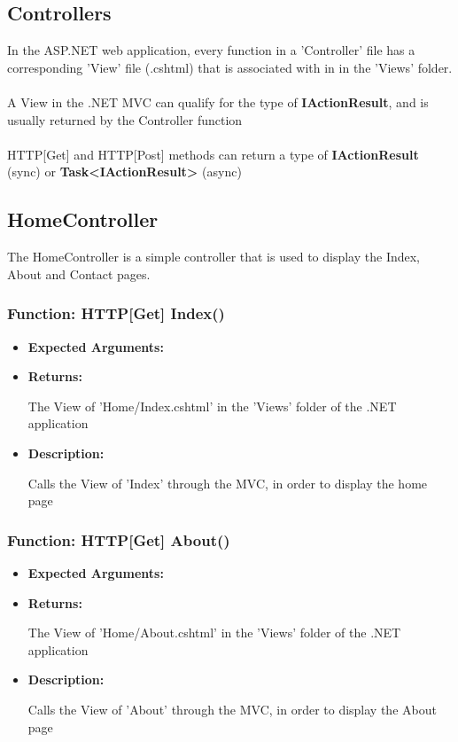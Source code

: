 \documentclass{scrreprt}
\begin{document}
\subsection{Controllers}

In the ASP.NET web application, every function in a 'Controller' file has a corresponding 'View' file (.cshtml) that is associated with in in the 'Views' folder.
\\\\
A View in the .NET MVC can qualify for the type of \textbf{IActionResult}, and is usually returned by the Controller function
\\\\
HTTP[Get] and HTTP[Post] methods can return a type of \textbf{IActionResult} (sync) or \textbf{Task\textless IActionResult\textgreater} (async)

\subsection{HomeController}
The HomeController is a simple controller that is used to display the Index, About and Contact pages.

\subsubsection{Function: HTTP[Get] Index()}
\begin{itemize}
    \item \textbf{Expected Arguments:}
    \item \textbf{Returns:}

    The View of 'Home/Index.cshtml' in the 'Views' folder of the .NET application

    \item \textbf{Description:}

    Calls the View of 'Index' through the MVC, in order to display the home page
\end{itemize}

\subsubsection{Function: HTTP[Get] About()}
\begin{itemize}
    \item \textbf{Expected Arguments:}
    \item \textbf{Returns:}

    The View of 'Home/About.cshtml' in the 'Views' folder of the .NET application

    \item \textbf{Description:}

    Calls the View of 'About' through the MVC, in order to display the About page
\end{itemize}
\end{document}
